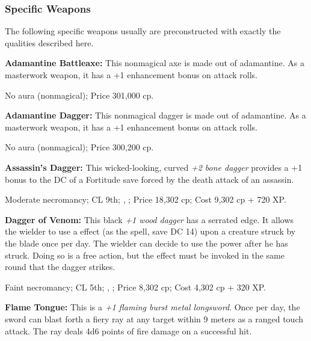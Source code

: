 \subsubsection{Specific Weapons}
The following specific weapons usually are preconstructed with exactly the qualities described here.

\textbf{Adamantine Battleaxe:} This nonmagical axe is made out of adamantine. As a masterwork weapon, it has a +1 enhancement bonus on attack rolls.

No aura (nonmagical); Price 301,000 cp.

\textbf{Adamantine Dagger:} This nonmagical dagger is made out of adamantine. As a masterwork weapon, it has a +1 enhancement bonus on attack rolls.

No aura (nonmagical); Price 300,200 cp.

\textbf{Assassin's Dagger:} This wicked-looking, curved \emph{+2 bone dagger} provides a +1 bonus to the DC of a Fortitude save forced by the death attack of an assassin.

Moderate necromancy; CL 9th; , ; Price 18,302 cp; Cost 9,302 cp + 720 XP.

\textbf{Dagger of Venom:} This black \emph{+1 wood dagger} has a serrated edge. It allows the wielder to use a  effect (as the spell, save DC 14) upon a creature struck by the blade once per day. The wielder can decide to use the power after he has struck. Doing so is a free action, but the  effect must be invoked in the same round that the dagger strikes.

Faint necromancy; CL 5th; , ; Price 8,302 cp; Cost 4,302 cp + 320 XP.



\textbf{Flame Tongue:} This is a \emph{+1 flaming burst metal longsword}. Once per day, the sword can blast forth a fiery ray at any target within 9 meters as a ranged touch attack. The ray deals 4d6 points of fire damage on a successful hit.

